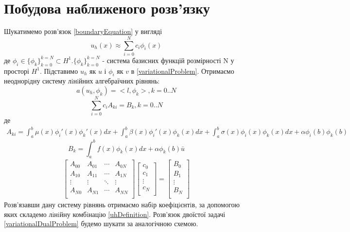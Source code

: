 \documentclass[a4paper]{article}
\numberwithin{equation}{section}
\begin{document}
\section{Побудова наближеного розв’язку}
Шукатимемо розв’язок \ref{boundaryEquation} у вигляді 
\begin{equation}\label{uhDefinition}
u_h(x)\approx\sum_{i=0}^{N} c_i\phi_i(x)
\end{equation}
де $\phi_i\in\{\phi_k\}_{k=0}^{k=N} \subset H^1. \{\phi_k\}_{k=0}^{k=N}$ - система базисних функцій розмірності N у просторі $H^1$. Підставимо $u_h$ як $u$ і $\phi_i$ як $v$ в \ref{variationalProblem}.
Отримаємо неоднорiдну систему лiнiйних алгебраїчних рiвнянь:
\begin{equation}
a(u_h, \phi_k)=<l,\phi_k>,  k=0..N
\end{equation}
\begin{equation}\label{matrixEquation}
\sum_{i=0}^{N} c_iA_{ki} = B_k,  k=0..N
\end{equation}
де
\begin{equation}\label{AkiLast}
\begin{split}
A_{ki}= \int_a^b \mu(x) \phi_i'(x) \phi_k'(x) dx + \int_a^b \beta(x) \phi_i'(x) \phi_k(x) dx+
\int_a^b \sigma(x) \phi_i(x) \phi_k(x) dx + \alpha \phi_i(b) \phi_k(b)  
\end{split}
\end{equation}
\begin{equation}\label{BkLast}
B_k=\int_a^bf(x)\phi_k(x)dx + \alpha \phi_k(b) \bar{u}
\end{equation}
\begin{eqnarray}\label{equationsSystem}
\begin{bmatrix}
A_{00} & A_{01} & \cdots & A_{0N} \\
A_{10} & A_{11} & \cdots & A_{1N} \\
\vdots & \vdots & \ddots & \vdots \\
A_{N0} & A_{N1} & \cdots & A_{NN} \\
\end{bmatrix}
\begin{bmatrix}
c_0 \\
c_1 \\
\vdots \\
c_N \\
\end{bmatrix}
=
\begin{bmatrix}
B_0 \\
B_1 \\
\vdots \\
B_N \\
\end{bmatrix}
\end{eqnarray}
Розв’язавши дану систему рiвнянь отримаємо набiр коефiцiєнтiв, за допомогою яких складемо лiнiйну комбiнацiю \ref{uhDefinition}. Розв'язок двоїстої задачі \ref{variationalDualProblem} будемо шукати за аналогічною схемою.
\end{document}
